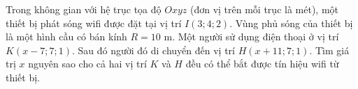 \begin{bt}%
	Trong không gian  với hệ trục tọa độ $Oxyz$ (đơn vị trên mỗi trục là mét), một thiết bị phát sóng wifi được đặt tại vị trí $I(3; 4; 2)$. Vùng phủ sóng của thiết bị là một hình cầu có bán kính $R=10$ m. Một người sử dụng điện thoại ở vị trí $K (x-7; 7; 1)$. Sau đó người đó di chuyển đến vị trí $H (x+11; 7; 1)$. Tìm giá trị $x$ nguyên sao cho cả hai vị trí $K$ và $H$ đều có thể bắt được tín hiệu wifi từ thiết bị.
\end{bt}

